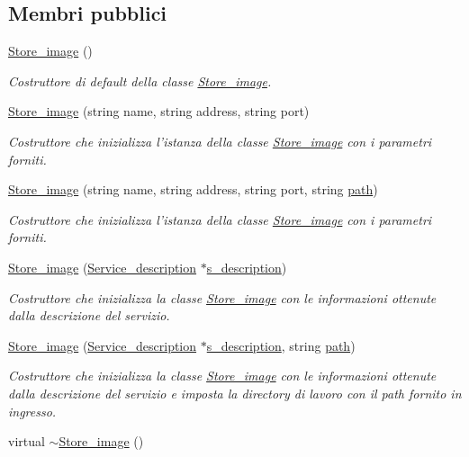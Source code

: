 \subsection*{Membri pubblici}
\begin{DoxyCompactItemize}
\item 
\hyperlink{class_store__image_a0aafc6c6b1b4576fe2de4d4a0feba356}{Store\-\_\-image} ()
\begin{DoxyCompactList}\small\item\em Costruttore di default della classe \hyperlink{class_store__image}{Store\-\_\-image}. \end{DoxyCompactList}\item 
\hyperlink{class_store__image_abb51b6465dd579b07268133b8c6dd8ef}{Store\-\_\-image} (string name, string address, string port)
\begin{DoxyCompactList}\small\item\em Costruttore che inizializza l'istanza della classe \hyperlink{class_store__image}{Store\-\_\-image} con i parametri forniti. \end{DoxyCompactList}\item 
\hyperlink{class_store__image_a5ac30f07f3db9fcbfc784ef79b6907c0}{Store\-\_\-image} (string name, string address, string port, string \hyperlink{class_store__image_ae7e32f8d0404e94e02a234ec54a17d70}{path})
\begin{DoxyCompactList}\small\item\em Costruttore che inizializza l'istanza della classe \hyperlink{class_store__image}{Store\-\_\-image} con i parametri forniti. \end{DoxyCompactList}\item 
\hyperlink{class_store__image_a2303ecf6c9d27ef0af198b27f924b460}{Store\-\_\-image} (\hyperlink{struct_service__description}{Service\-\_\-description} $\ast$\hyperlink{class_service_a55e991ff18c0dceca202388a771283dc}{s\-\_\-description})
\begin{DoxyCompactList}\small\item\em Costruttore che inizializza la classe \hyperlink{class_store__image}{Store\-\_\-image} con le informazioni ottenute dalla descrizione del servizio. \end{DoxyCompactList}\item 
\hyperlink{class_store__image_a89d05f2212b79d1aa5a297c217dc96cb}{Store\-\_\-image} (\hyperlink{struct_service__description}{Service\-\_\-description} $\ast$\hyperlink{class_service_a55e991ff18c0dceca202388a771283dc}{s\-\_\-description}, string \hyperlink{class_store__image_ae7e32f8d0404e94e02a234ec54a17d70}{path})
\begin{DoxyCompactList}\small\item\em Costruttore che inizializza la classe \hyperlink{class_store__image}{Store\-\_\-image} con le informazioni ottenute dalla descrizione del servizio e imposta la directory di lavoro con il path fornito in ingresso. \end{DoxyCompactList}\item 
\hypertarget{class_store__image_a8188f68bd84bf1408b1dd053392f005c}{virtual \hyperlink{class_store__image_a8188f68bd84bf1408b1dd053392f005c}{$\sim$\-Store\-\_\-image} ()}\label{class_store__image_a8188f68bd84bf1408b1dd053392f005c}


\end{DoxyCompactItemize}
